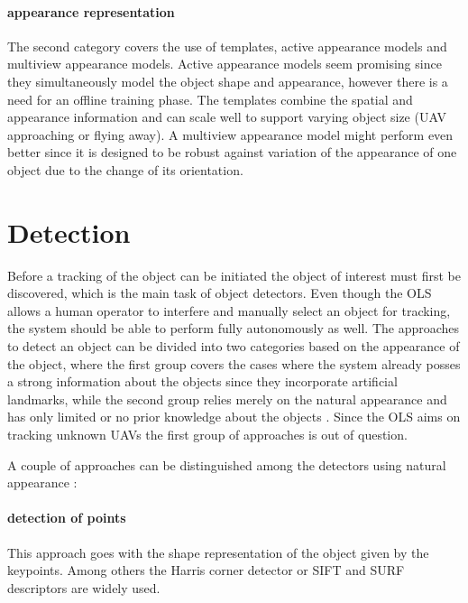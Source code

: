 \paragraph{appearance representation} 
The second category covers the use of templates, active appearance models and multiview appearance models. Active appearance models seem promising since they simultaneously model the object shape and appearance, however there is a need for an offline training phase. The templates combine the spatial and appearance information and can scale well to support varying object size (UAV approaching or flying away). A multiview appearance model might perform even better since it is designed to be robust against variation of the appearance of one object due to the change of its orientation.

\section{Detection}

Before a tracking of the object can be initiated the object of interest must first be discovered, which is the main task of object detectors. Even though the OLS allows a human operator to interfere and manually select an object for tracking, the system should be able to perform fully autonomously as well. The approaches to detect an object can be divided into two categories based on the appearance of the object, where the first group covers the cases where the system already posses a strong information about the objects since they incorporate artificial landmarks, while the second group relies merely on the natural appearance and has only limited or no prior knowledge about the objects \cite{Multi-Camera_Sensor_System_for_3D_Segmentation}. Since the OLS aims on tracking unknown UAVs the first group of approaches is out of question.

A couple of approaches can be distinguished among the detectors using natural appearance \cite{Yilmaz:2006:OTS:1177352.1177355}:

\paragraph{detection of points} This approach goes with the shape representation of the object given by the keypoints. Among others the Harris corner detector or SIFT and SURF descriptors are widely used.

